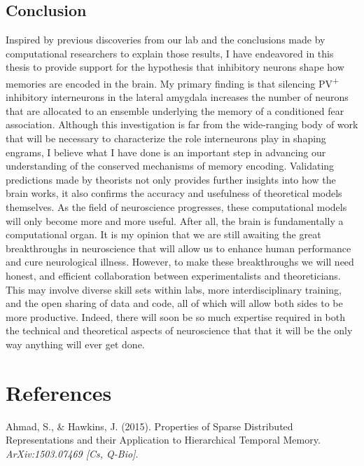 \documentclass[12pt,a4paperpaper,]{report}
\begin{document}
\section{Conclusion}\label{conclusion-1}

Inspired by previous discoveries from our lab and the conclusions made
by computational researchers to explain those results, I have endeavored
in this thesis to provide support for the hypothesis that inhibitory
neurons shape how memories are encoded in the brain. My primary finding
is that silencing PV\textsuperscript{+} inhibitory interneurons in the
lateral amygdala increases the number of neurons that are allocated to
an ensemble underlying the memory of a conditioned fear association.
Although this investigation is far from the wide-ranging body of work
that will be necessary to characterize the role interneurons play in
shaping engrams, I believe what I have done is an important step in
advancing our understanding of the conserved mechanisms of memory
encoding. Validating predictions made by theorists not only provides
further insights into how the brain works, it also confirms the accuracy
and usefulness of theoretical models themselves. As the field of
neuroscience progresses, these computational models will only become
more and more useful. After all, the brain is fundamentally a
computational organ. It is my opinion that we are still awaiting the
great breakthroughs in neuroscience that will allow us to enhance human
performance and cure neurological illness. However, to make these
breakthroughs we will need honest, and efficient collaboration between
experimentalists and theoreticians. This may involve diverse skill sets
within labs, more interdisciplinary training, and the open sharing of
data and code, all of which will allow both sides to be more productive.
Indeed, there will soon be so much expertise required in both the
technical and theoretical aspects of neuroscience that that it will be
the only way anything will ever get done.

\footnotesize

\chapter*{References}\label{references}

\hypertarget{refs}{}
\hypertarget{ref-ahmadux5fpropertiesux5f2015}{}
Ahmad, S., \& Hawkins, J. (2015). Properties of Sparse Distributed
Representations and their Application to Hierarchical Temporal Memory.
\emph{ArXiv:1503.07469 {[}Cs, Q-Bio{]}}.
\end{document}
